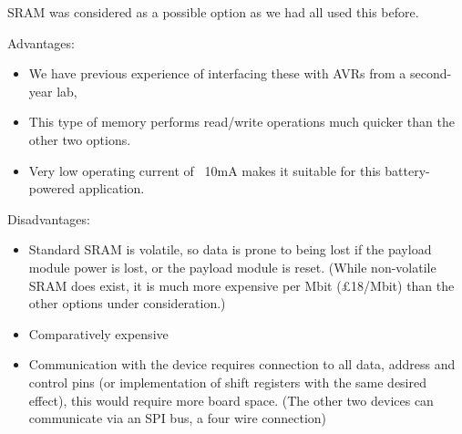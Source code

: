 SRAM was considered as a possible option as we had all used this before.

Advantages:
\begin{itemize}
\item We have previous experience of interfacing these with AVRs from a 
second-year lab, 
\item This type of memory performs read/write operations much quicker than 
the other two options.
\item Very low operating current of ~10mA makes it suitable for this battery-powered application.
\end{itemize}

Disadvantages:
\begin{itemize}
\item Standard SRAM is volatile, so data is prone to being lost if the payload 
module power is lost, or the payload module is reset. (While non-volatile SRAM 
does exist, it is much more expensive per Mbit (\pounds18/Mbit) than the other 
options under consideration.)
\item Comparatively expensive
\item Communication with the device requires connection to all data, address 
and control pins (or implementation of shift registers with the same desired 
effect), this would require more board space. (The other two devices can 
communicate via an SPI bus, a four wire connection)
\end{itemize}